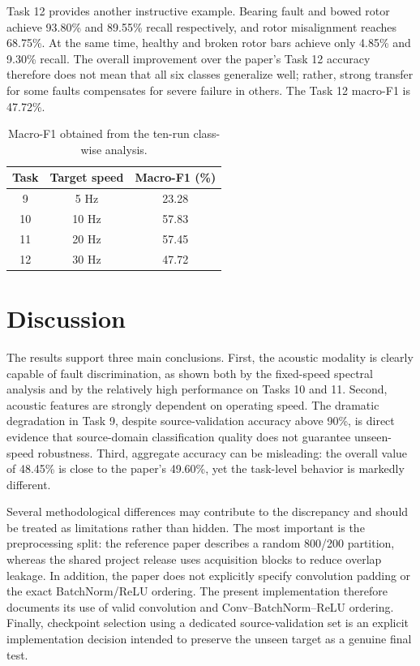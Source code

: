 \documentclass[10pt,a4paper,twocolumn]{article}
\begin{document}
Task 12 provides another instructive example. Bearing fault and bowed rotor achieve 93.80\% and 89.55\% recall respectively, and rotor misalignment reaches 68.75\%. At the same time, healthy and broken rotor bars achieve only 4.85\% and 9.30\% recall. The overall improvement over the paper's Task 12 accuracy therefore does not mean that all six classes generalize well; rather, strong transfer for some faults compensates for severe failure in others. The Task 12 macro-F1 is 47.72\%.

\begin{table}[!t]
\centering
\caption{Macro-F1 obtained from the ten-run class-wise analysis.}
\label{tab:macrof1}
\small
\begin{tabular}{c c c}
\toprule
\textbf{Task} & \textbf{Target speed} & \textbf{Macro-F1 (\%)}\\
\midrule
9 & 5 Hz  & 23.28\\
10 & 10 Hz & 57.83\\
11 & 20 Hz & 57.45\\
12 & 30 Hz & 47.72\\
\bottomrule
\end{tabular}
\end{table}

\section{Discussion}

The results support three main conclusions. First, the acoustic modality is clearly capable of fault discrimination, as shown both by the fixed-speed spectral analysis and by the relatively high performance on Tasks 10 and 11. Second, acoustic features are strongly dependent on operating speed. The dramatic degradation in Task 9, despite source-validation accuracy above 90\%, is direct evidence that source-domain classification quality does not guarantee unseen-speed robustness. Third, aggregate accuracy can be misleading: the overall value of 48.45\% is close to the paper's 49.60\%, yet the task-level behavior is markedly different.

Several methodological differences may contribute to the discrepancy and should be treated as limitations rather than hidden. The most important is the preprocessing split: the reference paper describes a random 800/200 partition, whereas the shared project release uses acquisition blocks to reduce overlap leakage. In addition, the paper does not explicitly specify convolution padding or the exact BatchNorm/ReLU ordering. The present implementation therefore documents its use of valid convolution and Conv--BatchNorm--ReLU ordering. Finally, checkpoint selection using a dedicated source-validation set is an explicit implementation decision intended to preserve the unseen target as a genuine final test.
\end{document}
